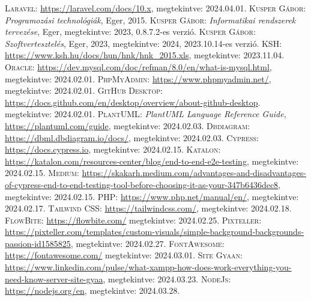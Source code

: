 \documentclass[]{thesis-ekf}
\theoremstyle{definition}
\theoremstyle{remark}
\begin{document}
	
	\begin{thebibliography}{2}
		\textsc{Laravel:} \url{https://laravel.com/docs/10.x},  megtekintve: 2024.04.01.
		\textsc{Kusper Gábor}: \emph{Programozási technológiák}, Eger, 2015.
		\textsc{Kusper Gábor}: \emph{Informatikai rendszerek tervezése}, Eger, megtekintve: 2023, 0.8.7.2-es verzió.
		\textsc{Kusper Gábor}: \emph{Szoftvertesztelés}, Eger, 2023, megtekintve: 2024, 2023.10.14-es verzió.
		\textsc{KSH}: \url{https://www.ksh.hu/docs/hun/hnk/hnk_2015.xls}, megtekintve: 2023.11.04.
		\textsc{Oracle}: \url{https://dev.mysql.com/doc/refman/8.0/en/what-is-mysql.html}, megtekintve: 2024.02.01.
		\textsc{PhpMyAdmin}: \url{https://www.phpmyadmin.net/}, megtekintve: 2024.02.01.
		\textsc{GitHub Desktop}: \url{https://docs.github.com/en/desktop/overview/about-github-desktop}. megtekintve: 2024.02.01.
		\textsc{PlantUML}: \emph{PlantUML Language Reference Guide}, \url{https://plantuml.com/guide}, megtekintve: 2024.02.03.
		\textsc{Dbdiagram}: \url{https://dbml.dbdiagram.io/docs/},  megtekintve: 2024.02.03.
		\textsc{Cypress}: \url{https://docs.cypress.io},  megtekintve: 2024.02.15.
		\textsc{Katalon}: \url{https://katalon.com/resources-center/blog/end-to-end-e2e-testing},  megtekintve: 2024.02.15.
		\textsc{Medium}: \url{https://skakarh.medium.com/advantages-and-disadvantages-of-cypress-end-to-end-testing-tool-before-choosing-it-as-your-347b6436dec8}, megtekintve: 2024.02.15.
		\textsc{PHP}: \url{https://www.php.net/manual/en/},  megtekintve: 2024.02.17.
		\textsc{Tailwind CSS}: \url{https://tailwindcss.com/}, megtekintve: 2024.02.18.
		\textsc{FlowBite}: \url{https://flowbite.com/} megtekintve: 2024.02.25.
		\textsc{Pixteller}: \url{https://pixteller.com/templates/custom-visuals/simple-background-backgrounds-passion-id1585825}, megtekintve: 2024.02.27.
		\textsc{FontAwesome}: \url{https://fontawesome.com/} megtekintve: 2024.03.01.
		\textsc{Site Gyaan}: \url{https://www.linkedin.com/pulse/what-xampp-how-does-work-everything-you-need-know-server-site-gyaa}, megtekintve: 2024.03.23.
		\textsc{NodeJs}: \url{https://nodejs.org/en}, megtekintve: 2024.03.28.

\end{thebibliography}
\end{document}
